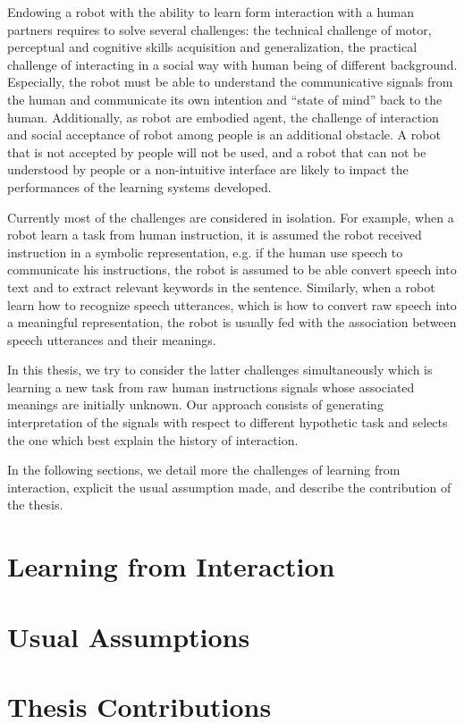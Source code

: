 Endowing a robot with the ability to learn form interaction with a human partners requires to solve several challenges: the technical challenge of motor, perceptual and cognitive skills acquisition and generalization, the practical challenge of interacting in a social way with human being of different background. Especially, the robot must be able to understand the communicative signals from the human and communicate its own intention and ``state of mind'' back to the human. Additionally, as robot are embodied agent, the challenge of interaction and social acceptance of robot among people is an additional obstacle. A robot that is not accepted by people will not be used, and a robot that can not be understood by people or a non-intuitive interface are likely to impact the performances of the learning systems developed.

Currently most of the challenges are considered in isolation. For example, when a robot learn a task from human instruction, it is assumed the robot received instruction in a symbolic representation, e.g. if the human use speech to communicate his instructions, the robot is assumed to be able convert speech into text and to extract relevant keywords in the sentence. Similarly, when a robot learn how to recognize speech utterances, which is how to convert raw speech into a meaningful representation, the robot is usually fed with the association between speech utterances and their meanings.

In this thesis, we try to consider the latter challenges simultaneously which is learning a new task from raw human instructions signals whose associated meanings are initially unknown. Our approach consists of generating interpretation of the signals with respect to different hypothetic task and selects the one which best explain the history of interaction.

In the following sections, we detail more the challenges of learning from interaction, explicit the usual assumption made, and describe the contribution of the thesis.

\section{Learning from Interaction}


\section{Usual Assumptions}


\section{Thesis Contributions}


